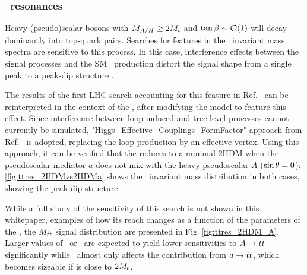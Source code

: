 \subsubsection{\ttbar\ resonances}

Heavy (pseudo)scalar bosons with $M_{A/H}\ge2M_{t}$ and $\tan\beta \sim \mathcal{O}(1)$ will decay dominantly into top-quark pairs. Searches for features in the \ttbar\ invariant mass spectra are sensitive to this process. 
In this case, interference effects between the signal processes and the SM \ttbar\ production distort the signal shape from a single peak to a peak-dip structure \cite{Carena:2016npr}. 

The results of the first LHC search accounting for this feature in Ref.~\cite{Aaboud:2017hnm} can be reinterpreted in the context of the \hdma, after modifying the \mg model to feature this effect. Since interference between loop-induced and tree-level processes cannot currently be simulated, "Higgs\_Effective\_Couplings\_FormFactor" approach from Ref.~\cite{Aaboud:2017hnm} is adopted, replacing the loop production by an effective vertex. 
Using this approach, it can be verified that the \hdma reduces to a minimal 2HDM when the pseudoscalar mediator $a$ does not mix with the heavy pseudoscalar $A$ ($\sin\theta=0$): \autoref{fig:ttres_2HDMvs2HDMa} shows the \ttbar\ invariant mass distribution in both cases, showing the peak-dip structure. 

While a full study of the sensitivity of this search is not shown in this whitepaper, examples of how its reach changes as a function of the parameters of the \hdma, the $M_{\bar{t}t}$ signal distribution are presented in Fig~\ref{fig:ttres_2HDM_A}. Larger values of \tanb\ or \sinp\ are expected to yield lower sensitivities to $A\rightarrow\bar{t}t$ significantly while \ma\ almost only affects the contribution from $a\rightarrow\bar{t}t$, which becomes sizeable if \ma is close to $2M_{t}$.

